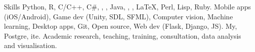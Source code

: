 
\begin{rubric}{Skills}
	Python, R, C/C++, C\#, , , Java, ,
	, \LaTeX, Perl, Lisp, Ruby.
	Mobile apps (iOS/Android), Game dev (Unity, SDL, SFML),
	Computer vision, Machine learning, Desktop apps, Git, Open source, Web dev
	(Flask, Django, JS).
\entry*[Databases]
	My, Postgre,  ite.
\entry*[Misc.]
	Academic research, teaching, training, consultation, data analysis and visualisation.
\end{rubric}
